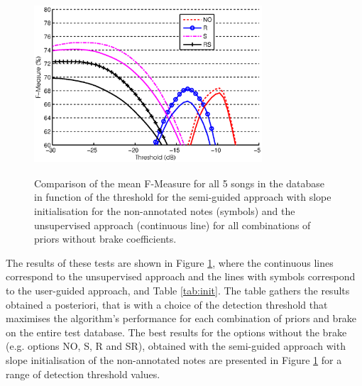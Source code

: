 \documentclass{article}
\begin{document}
\begin{figure}[!ht]
\begin{minipage}[b]{1.0\linewidth}
  \centering
  \centerline{\includegraphics[width=8.5cm, height=6.7cm]{figures/finalnobrake.eps}}
\end{minipage}
\caption{Comparison of the mean F-Measure for all 5 songs in the database in function of the threshold for the semi-guided approach with slope initialisation for the non-annotated notes (symbols) and the unsupervised approach (continuous line) for all combinations of priors without brake coefficients.}
\label{fig:fxt-nobrake}
\end{figure}

\vspace{0.2cm}

The results of these tests are shown in Figure \ref{fig:fxt-nobrake}, where the continuous lines correspond to the unsupervised approach and the lines with symbols correspond to the user-guided approach, and Table \ref{tab:init}.  The table gathers the results obtained a posteriori, that is with a choice of the detection threshold that maximises the algorithm's performance for each combination of priors and brake on the entire test database. The best results for the options without the brake (e.g. options NO, S, R and SR), obtained with the semi-guided approach with slope initialisation of the non-annotated notes are presented in Figure \ref{fig:fxt-nobrake} for a range of detection threshold values.

\vspace{0.2cm}
\end{document}
